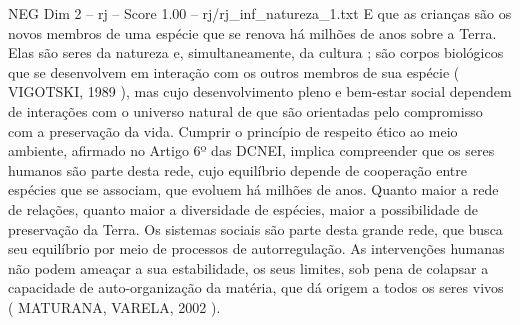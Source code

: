 \begin{textsample}{NEG Dim 2 – rj – Score 1.00 – rj/rj\_inf\_natureza\_1.txt}
E que as crianças são os novos membros de uma espécie que se renova há milhões de anos sobre a Terra.
Elas são seres da natureza e, simultaneamente, da cultura ; são corpos biológicos que se desenvolvem em interação com os outros membros de sua espécie ( VIGOTSKI, 1989 ), mas cujo desenvolvimento pleno e bem-estar social dependem de interações com o universo natural de que são orientadas pelo compromisso com a preservação da vida.
Cumprir o princípio de respeito ético ao meio ambiente, afirmado no Artigo 6º das DCNEI, implica compreender que os seres humanos são parte desta rede, cujo equilíbrio depende de cooperação entre espécies que se associam, que evoluem há milhões de anos.
Quanto maior a rede de relações, quanto maior a diversidade de espécies, maior a possibilidade de preservação da Terra.
Os sistemas sociais são parte desta grande rede, que busca seu equilíbrio por meio de processos de autorregulação.
As intervenções humanas não podem ameaçar a sua estabilidade, os seus limites, sob pena de colapsar a capacidade de auto-organização da matéria, que dá origem a todos os seres vivos ( MATURANA, VARELA, 2002 ).

\end{textsample}
